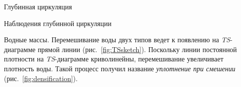 \begin{chapter}{Глубинная циркуляция}
\begin{section}{Наблюдения глубинной циркуляции}
\begin{paragraph}{Водные массы.}
Перемешивание воды двух типов ведет к 
появлению на \emph{TS}-диаграмме прямой линии (рис.~\ref{fig:TSsketch}). 
Поскольку линии постоянной плотности на \emph{TS}-диаграмме криволинейны,
перемешивание увеличивает плотность
воды. Такой процесс получил название 
\emph{уплотнение при смешении} 
(рис.~\ref{fig:densification}).
%
\end{paragraph}


\end{section}
\end{chapter}
